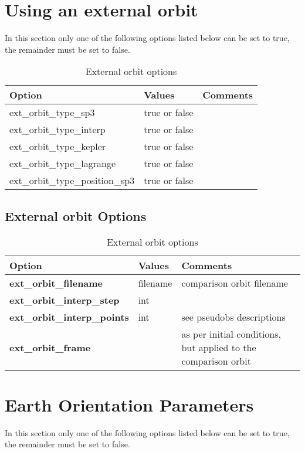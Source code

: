 %
\section{Using an external orbit}
In this section only one of the following options listed below can be set to true, the remainder must be set to false.\\
\begin{table}[h!]
\begin{tabular}{|p{4.5cm}|p{2cm}|p{3.5cm}|}
	\hline
	Option & Values & Comments \\
	\hline
	ext\_orbit\_type\_sp3  & true or false & \\
	ext\_orbit\_type\_interp & true or false & \\
	ext\_orbit\_type\_kepler & true or false & \\
	ext\_orbit\_type\_lagrange & true or false & \\
	ext\_orbit\_type\_position\_sp3 & true or false & \\
    \hline
\end{tabular}
	\caption{External orbit options}
\label{table:yaml}
\end{table}
%
\subsection{External orbit Options}
\begin{table}[h!]
	\begin{tabular}{|p{4cm}|p{2cm}|p{4cm}|}
		\hline
		Option & Values & Comments \\
		\hline
        \textbf{ext\_orbit\_filename} & filename & comparison orbit filename \\
        \textbf{ext\_orbit\_interp\_step} & int & \\ 
        \textbf{ext\_orbit\_interp\_points} & int & see pseudobs descriptions \\
        \textbf{ext\_orbit\_frame} & & as per initial conditions, but applied to the comparison orbit\\ 
        \hline
\end{tabular}
\caption{External orbit options}
\label{table:yaml}
\end{table}
%        
\section{Earth Orientation Parameters}
In this section only one of the following options listed below can be set to true, the remainder must be set to false.\\

